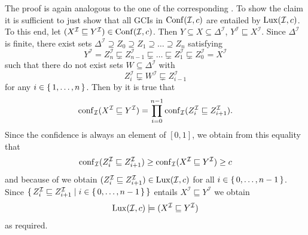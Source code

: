 \begin{Proof}
  The proof is again analogous to the one of the corresponding
  .  To show the claim it is sufficient to just show that all
  GCIs in $\operatorname{Conf}(\mathcal{I}, c)$ are entailed by $\operatorname{Lux}(\mathcal{I}, c)$.  To this end,
  let $(X^{\mathcal{I}} \sqsubseteq Y^{\mathcal{I}}) \in \operatorname{Conf}(\mathcal{I}, c)$.  Then $Y
  \subseteq X \subseteq \Delta^{\mathcal{I}}$, \ie $Y^{\mathcal{I}} \sqsubseteq
  X^{\mathcal{I}}$.  Since $\Delta^{\mathcal{I}}$ is finite, there exist sets
  $\Delta^{\mathcal{I}} \supseteq Z_0 \supseteq Z_1 \supseteq \dots \supseteq Z_n$
  satisfying
  \begin{equation*}
    Y^{\mathcal{I}} = Z_n^{\mathcal{I}} \sqsubsetneq Z_{n-1}^{\mathcal{I}} \sqsubsetneq
    \dots \sqsubsetneq Z_1^{\mathcal{I}} \sqsubsetneq Z_0^{\mathcal{I}} = X^{\mathcal{I}}
  \end{equation*}
  such that there do not exist sets $W \subseteq \Delta^{\mathcal{I}}$ with
  \begin{equation}
    \label{eq:25}
    Z_i^{\mathcal{I}} \sqsubsetneq W^{\mathcal{I}} \sqsubsetneq Z_{i-1}^{\mathcal{I}}
  \end{equation}
  for any $i \in {\ensuremath{\{\, 1, \dots, n \,\}}}$.  Then by
   it is true that
  \begin{equation*}
    \operatorname{conf}_{\mathcal{I}}(X^{\mathcal{I}} \sqsubseteq Y^{\mathcal{I}}) = \prod_{i = 0}^{n-1}
    \operatorname{conf}_{\mathcal{I}}(Z_i^{\mathcal{I}} \sqsubseteq Z_{i+1}^{\mathcal{I}}).
  \end{equation*}
  Since the confidence is always an element of $[0,1]$, we obtain from this equality that
  \begin{equation*}
    \operatorname{conf}_{\mathcal{I}}(Z_i^{\mathcal{I}} \sqsubseteq Z_{i+1}^{\mathcal{I}}) \ge
    \operatorname{conf}_{\mathcal{I}}(X^{\mathcal{I}} \sqsubseteq Y^{\mathcal{I}}) \ge c
  \end{equation*}
  and because of  we obtain $(Z_i^{\mathcal{I}} \sqsubseteq
  Z_{i+1}^{\mathcal{I}}) \in \operatorname{Lux}(\mathcal{I}, c)$ for all $i \in {\ensuremath{\{\, 0, \dots, n-1\,\}}}$.
  Since ${\{\, Z_i^{\mathcal{I}} \sqsubseteq Z_{i+1}^{\mathcal{I}} \mid i \in {\ensuremath{\{\, 0,
      \dots, n-1\,\}}} \,\}}$ entails $X^{\mathcal{I}} \sqsubseteq Y^{\mathcal{I}}$ we obtain
  \begin{equation*}
    \operatorname{Lux}(\mathcal{I}, c) \models (X^{\mathcal{I}} \sqsubseteq Y^{\mathcal{I}})
  \end{equation*}
  as required.
\end{Proof}

